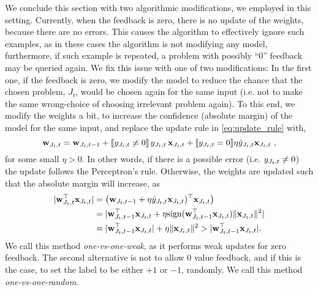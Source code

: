 We conclude this section with two algorithmic modifications, we employed in this setting. 
Currently, when the feedback is zero, there is no update of the weights, because there are no errors.
 This causes the algorithm to effectively ignore such examples, as in these cases the algorithm is not 
 modifying any model, furthermore, if such example is repeated, a problem with possibly ``0'' feedback 
 may be queried again.
We fix this issue with one of two modifications: In the first one, if the feedback is zero, we modify the model 
to reduce the chance that the chosen problem, $J_t$, would be chosen again for the same input 
(i.e. not to make the same wrong-choice of choosing irrelevant problem again). To this end, we modify the 
weights a bit, to increase the confidence (absolute margin) of the model for the same input, and replace the 
update rule in \eqref{eq:update_rule} with,
\[
\mathbf{w}_{J_t,t} = \mathbf{w}_{J_t,t-1}+ [\![{y_{J_t,t}\ne0}]\!] \, y_{J_t,t}\, \mathbf{x}_{J_t,t} +
 [\![{y_{J_t,t}=0}]\!] \eta \hat{y}_{J_t,t}\mathbf{x}_{J_t,t}~,
\]
for some small $\eta>0$. In other words, if there is a possible error (i.e. $y_{J_t,t}\ne0$) the update follows the 
Perceptron's rule. Otherwise, the weights are updated such that the absolute margin will increase, 
as 
\[
\begin{split}
\vert {\mathbf{w}}^{\top}_{J_t,t} \mathbf{x}_{J_t,t} \vert &= \left({\mathbf{w}_{J_t,t-1}+ \eta \hat{y}_{J_t,t}\mathbf{x}_{J_t,t})^{\top}\mathbf{x}_{J_t,t}}\right)\\ 
&= \vert {\mathbf{w}}^{\top}_{J_t,t-1}\mathbf{x}_{J_t,t}+ \eta {\rm sign}({\mathbf{w}}^{\top}_{J_t,t-1}\mathbf{x}_{J_t,t}) \Vert\mathbf{x}_{J_t,t}\Vert^2 \vert\\
&=\vert {\mathbf{w}}^{\top}_{J_t,t-1}\mathbf{x}_{J_t,t}\vert + \eta \Vert\mathbf{x}_{J_t,t}\Vert^2 >\vert {\mathbf{w}}^{\top}_{J_t,t-1}\mathbf{x}_{J_t,t}\vert. 
\end{split}
\]
We call this method {\em one-vs-one-weak}, as it performs weak updates for zero feedback. 
The second alternative is not to allow $0$ value feedback, and if this is the case, to set the label to be 
either $+1$ or $-1$, randomly.
We call this method {\em one-vs-one-random}.
